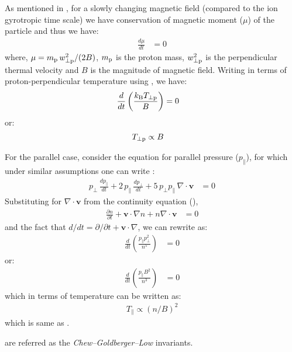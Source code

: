 As mentioned in , for a slowly changing magnetic field (compared to the ion gyrotropic
time scale) we have conservation of magnetic moment ($\mu$) of the particle and thus we have:
\begin{align}
    \frac{d \mu}{dt} & = 0 \label{eq:cgl1}
\end{align}
where, $\mu = m_{\rm p}\,w_{\rm \perp p}^2/(2B)$, $m_{\rm p}$ is the proton mass, $w_{\rm \perp
p}^2$ is the perpendicular thermal velocity and $B$ is the magnitude of magnetic field. Writing
 in terms of proton-perpendicular temperature using , we have:
\begin{align}
    \frac{d}{dt} \left(\frac{k_{\rm B} T_{\rm \perp p}}{B}\right) & = 0 \label{eq:cgl2}
\end{align}
or:
\begin{align}
    T_{\rm \perp p} & \propto B \label{eq:cgl3}
\end{align}

For the parallel case, consider the equation for parallel pressure ($p_\parallel$), for which under
similar assumptions one can write \citep{Baumjohann1996}:
\begin{align}
    p_\perp \, \frac{dp_\parallel}{dt} + 2\,p_\parallel\,\frac{dp_\perp}{dt} + 5\,p_\perp p_\parallel \, \nabla \cdot \mathbf{v} & = 0\label{eq:cgl4}
\end{align}
Substituting for $\nabla \cdot \mathbf{v}$ from the continuity equation (),
\begin{align}
    \frac{\partial n}{\partial t} + \mathbf{v} \cdot \nabla n + n \nabla \cdot \mathbf{v} & = 0 \label{eq:cgl5}
\end{align}
and the fact that $d/dt = \partial/\partial t + \mathbf{v}\cdot\nabla$, we can rewrite
 as:
\begin{align}
    \frac{d}{dt}\left(\frac{p_\parallel p_\perp^2}{n^5} \right) & = 0 \label{eq:cgl6}
\end{align}
or:
\begin{align}
        \frac{d}{dt} \left(\frac{p_\parallel B^2}{n^3}\right) & = 0 \label{eq:cgl7}
\end{align}
which in terms of temperature can be written as:
\begin{align}
    T_\parallel \propto \left(n/B\right)^2 \label{eq:cgl8}
\end{align}
which is same as .

 are referred as the \textit{Chew–Goldberger–Low} invariants.